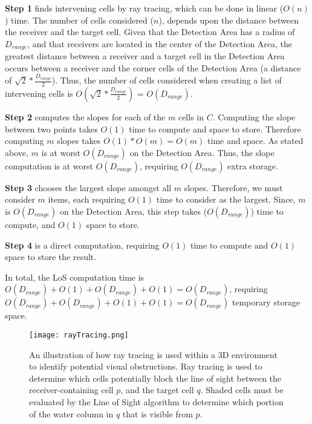 \noindent\textbf{Step 1} finds intervening cells by ray tracing, which can be done in linear ($O(n)$) time.  The number of cells considered ($n$), depends upon the distance between the receiver and the target cell\cite{rayTracing}.  Given that the Detection Area has a radius of $D_{range}$, and that receivers are located in the center of the Detection Area, the greatest distance between a receiver and a target cell in the Detection Area occurs between a receiver and the corner cells of the Detection Area (a distance of $\sqrt2*\frac{D_{range}}{2}$).  Thus, the number of cells considered when creating a list of intervening cells is $O(\sqrt2*\frac{D_{range}}{2})$ = $O(D_{range})$.

\noindent\textbf{Step 2} computes the slopes for each of the $m$ cells in $C$.  Computing the slope between two points takes $O(1)$ time to compute and space to store.  Therefore computing $m$ slopes takes $O(1)*O(m)=O(m)$ time and space.  As stated above, $m$ is at worst $O(D_{range})$ on the Detection Area.  Thus, the slope computation is at worst $O(D_{range})$, requiring $O(D_{range})$ extra storage.

\noindent\textbf{Step 3} chooses the largest slope amongst all $m$ slopes.  Therefore, we must consider $m$ items, each requiring $O(1)$ time to consider as the largest.  Since, $m$ is $O(D_{range})$ on the Detection Area, this step takes ($O(D_{range})$) time to compute, and $O(1)$ space to store.  

\noindent\textbf{Step 4} is a direct computation, requiring $O(1)$ time to compute and $O(1)$ space to store the result.

In total, the LoS computation time is $O(D_{range}) + O(1) + O(D_{range}) + O(1) = O(D_{range})$, requiring $O(D_{range}) + O(D_{range}) + O(1) + O(1) = O(D_{range})$ temporary storage space.
\begin{figure}[ht]
	\label{rayTracingImg}
	\centering
	\texttt{[image: rayTracing.png]}
	\caption{An illustration of how ray tracing is used within a 3D environment to identify potential visual obstructions.  Ray tracing is used to determine which cells potentially block the line of sight between the receiver-containing cell $p$, and the target cell $q$.  Shaded cells must be evaluated by the Line of Sight algorithm to determine which portion of the water column in $q$ that is visible from $p$. \cite{Akbarzadeh2013}}
\end{figure}


